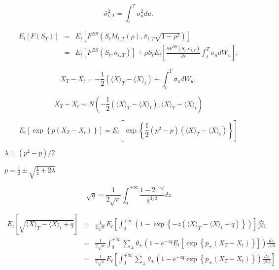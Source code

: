 \documentclass[12pt]{article}
\begin{document}
  \begin{equation}
    \bar\sigma_{t,T}^2=\int_t^T\sigma_u^2du.
  \end{equation}

  \begin{eqnarray}
           E_t\left[F(S_T)\right]
    &=&E_t\left[F^{BS}\left(S_tM_{t,T}(\rho),\bar\sigma_{t,T}\sqrt{1-\rho^2}\right)\right]\nonumber\\
    &=&E_t\left[F^{BS}(S_t,\bar\sigma_{t,T})\right]
              + \rho S_tE_t\left[\frac{\partial F^{BS}(S_t,\bar\sigma_{t,T})}{\partial s}\int_t^T\sigma_udW_u\right],
  \end{eqnarray}

  \begin{equation}
    X_T-X_t=-\frac{1}{2}\left(\langle X \rangle_T - \langle X \rangle_t\right) + \int_t^T\sigma_udW_u,
  \end{equation}

  \begin{equation}
    X_T-X_t\sim N\left(-\frac{1}{2}\left(\langle X \rangle_T - \langle X \rangle_t\right), \langle X \rangle_T - \langle X \rangle_t\right)
  \end{equation}

  \begin{equation}
    E_t\left[\exp\left\{p\left(X_T-X_t\right)\right\}\right] = E_t\left[\exp\left\{\frac{1}{2}\left(p^2-p\right)\left(\langle X \rangle_T - \langle X \rangle_t\right)\right\}\right]
  \end{equation}

  $\lambda=(p^2-p)/2$

  $p=\frac{1}{2}\pm\sqrt{\frac{1}{4}+2\lambda}$


  \begin{equation}
    \sqrt{q} = \frac{1}{2\sqrt{\pi}}\int_0^{+\infty}\frac{1-2^{-zq}}{z^{3/2}}dz
  \end{equation}

  \begin{eqnarray}
                      E_t\left[\sqrt{\langle X \rangle_T - \langle X \rangle_t+q}\right]
    &=&\frac{1}{2\sqrt{\pi}}E_t\left[\int_0^{+\infty}\left(1-\exp\left\{-z\left(\langle X \rangle_T - \langle X \rangle_t+q\right)\right\}\right)\right]\frac{dz}{z^{3/2}}\nonumber\\
    &=&\frac{1}{2\sqrt{\pi}}\int_0^{+\infty}\sum_{\pm}\theta_{\pm}\left(1-e^{-zq}E_t\left[\exp\left\{p_{\pm}\left(X_T-X_t\right)\right\}\right]\right)\frac{dz}{z^{3/2}}\nonumber\\
    &=&\frac{1}{2\sqrt{\pi}}E_t\left[\int_0^{+\infty}\sum_{\pm}\theta_{\pm}\left(1-e^{-zq}\exp\left\{p_{\pm}\left(X_T-X_t\right)\right\}\right)\frac{dz}{z^{3/2}}\right]
  \end{eqnarray}
\end{document}
